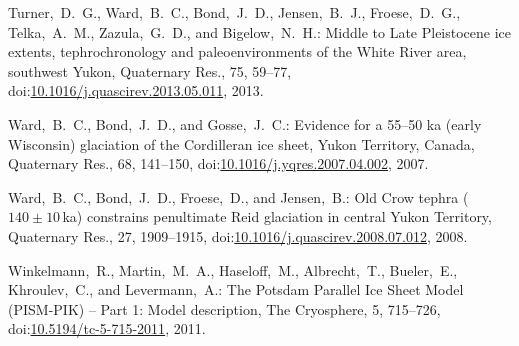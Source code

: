 \documentclass[tc, manuscript]{copernicus}
\begin{document}
\begin{thebibliography}{114}
Turner,~D.~G., Ward,~B.~C., Bond,~J.~D., Jensen,~B.~J., Froese,~D.~G., Telka,~A.~M., Zazula,~G.~D., and Bigelow,~N.~H.: Middle to Late Pleistocene ice extents, tephrochronology and paleoenvironments of the White River area, southwest Yukon, Quaternary Res., 75, 59--77,
doi:\href{http://dx.doi.org/10.1016/j.quascirev.2013.05.011}{10.1016/j.quascirev.2013.05.011}, 2013.


Ward,~B.~C., Bond,~J.~D., and Gosse,~J.~C.: Evidence for a 55--50 ka (early Wisconsin) glaciation of the Cordilleran ice sheet, Yukon Territory, Canada, Quaternary Res., 68, 141--150,
doi:\href{http://dx.doi.org/10.1016/j.yqres.2007.04.002}{10.1016/j.yqres.2007.04.002}, 2007.


Ward,~B.~C., Bond,~J.~D., Froese,~D., and Jensen,~B.: Old Crow tephra ($140\pm10$\,ka) constrains penultimate Reid glaciation in central Yukon Territory, Quaternary Res., 27, 1909--1915,
doi:\href{http://dx.doi.org/10.1016/j.quascirev.2008.07.012}{10.1016/j.quascirev.2008.07.012}, 2008.


 Winkelmann,~R., Martin,~M.~A., Haseloff,~M., Albrecht,~T., Bueler,~E., Khroulev,~C., and Levermann,~A.: The Potsdam Parallel Ice Sheet Model (PISM-PIK) -- Part 1: Model description, The Cryosphere, 5, 715--726,
doi:\href{http://dx.doi.org/10.5194/tc-5-715-2011}{10.5194/tc-5-715-2011}, 2011.



\end{thebibliography}
\end{document}
